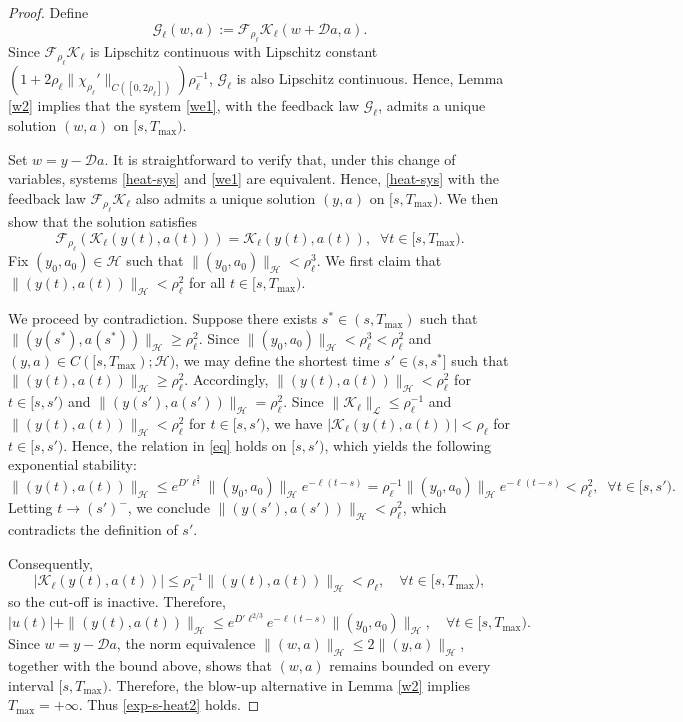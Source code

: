 \documentclass[10pt,a4paper]{amsart}
\begin{document}
\begin{proof}
Define
\begin{equation}\label{Gfeed-new}
\mathcal G_\ell(w,a):=\mathcal F_{\rho_\ell}\mathcal K_\ell(w+\mathcal Da,a).
\end{equation}
Since $\mathcal{F}_{\rho_{\ell}}\mathcal{K}_{\ell}$ is Lipschitz continuous with Lipschitz constant $(1+2{\rho_{\ell}}\|\chi_{\rho_{\ell}}'\|_{C([0,2\rho_{\ell}])})\rho_{\ell}^{-1}$, $\mathcal G_\ell$ is also Lipschitz continuous. Hence, Lemma \ref{w2} implies that the system \eqref{we1}, with the feedback law $\mathcal G_\ell$, admits a unique solution $(w,a)$ on $[s,T_{\max})$.

Set $w=y-\mathcal D a$. It is straightforward to verify that, under this change of variables, systems \eqref{heat-sys} and \eqref{we1} are equivalent. Hence, \eqref{heat-sys} with the feedback law $\mathcal{F}_{\rho_{\ell}}\mathcal{K}_{\ell}$ also admits a unique solution $(y,a)$ on $[s,T_{\max})$. We then show that the solution satisfies
\begin{equation}\label{eq}
\mathcal{F}_{\rho_{\ell}}(\mathcal{K}_{\ell}(y(t),a(t)))=\mathcal{K}_{\ell}(y(t),a(t)),\;\;\forall  t\in [s,T_{\max}).
\end{equation}
Fix $(y_0,a_0)\in \mathcal{H}$ such that
$\| (y_0,a_0)\|_{\mathcal{H}}<\rho_{\ell}^3$. We first claim that $\| (y(t),a(t))\|_{\mathcal{H}}< \rho_{\ell}^2$ for all $t\in [s,T_{\max})$.
	
We proceed by contradiction. Suppose there exists $s^*\in (s,T_{\max})$ such that $\|(y(s^*),a(s^*))\|_{\mathcal{H}}\ge \rho_{\ell}^2$.
Since $\| (y_0,a_0)\|_{\mathcal{H}}<\rho_{\ell}^3<\rho_{\ell}^2$ and $(y,a)\in C([s,T_{\max});\mathcal{H})$, we may define the shortest time $s'\in(s,s^*]$ such that $\| (y(t),a(t))\|_{\mathcal{H}}\ge \rho_{\ell}^2$. Accordingly,
$\| (y(t),a(t))\|_{\mathcal{H}}<  \rho_{\ell}^2$ for $t\in [s,s')$ and $\| (y(s'),a(s'))\|_{\mathcal{H}}=\rho_{\ell}^2$. Since $\|\mathcal K_\ell\|_{\mathcal L}\le\rho_\ell^{-1}$ and $\|(y(t),a(t))\|_{\mathcal H}<\rho_\ell^2$ for $t\in[s,s')$, we have $|\mathcal K_\ell(y(t),a(t))|<\rho_\ell$ for $t\in [s,s')$. Hence, the relation in \eqref{eq} holds on $[s,s')$, which yields the following exponential stability:
$$\| (y(t),a(t))\|_{\mathcal{H}}\le e^{D'{\ell}^{\frac{2}{3}}}\| (y_0,a_0)\|_{\mathcal{H}}e^{-\ell(t-s)}=\rho_{\ell}^{-1}\| (y_0,a_0)\|_{\mathcal{H}}e^{-\ell(t-s)}<\rho_{\ell}^2, \;\; \forall t\in [s,s').$$
Letting $t\to (s')^-$, we conclude $\| (y(s'),a(s'))\|_{\mathcal{H}}<\rho_{\ell}^2$, which contradicts the definition of $s'$. 

Consequently,
$$|\mathcal K_\ell(y(t),a(t))|
\le \rho_\ell^{-1}\|(y(t),a(t))\|_{\mathcal H}
<\rho_\ell,\quad \forall t\in[s,T_{\max}),$$
so the cut-off is inactive. Therefore,
$$|u(t)|+\|(y(t),a(t))\|_{\mathcal H}
\le e^{D'\ell^{2/3}}e^{-\ell(t-s)}
\|(y_0,a_0)\|_{\mathcal H},\quad \forall t\in[s,T_{\max}).$$
Since $w=y-\mathcal Da$, the norm equivalence $\|(w,a)\|_{\mathcal H}\le 2\|(y,a)\|_{\mathcal H}$, together with the bound above, shows that $(w,a)$ remains bounded on every interval $[s,T_{\max})$. Therefore, the blow-up alternative in Lemma \ref{w2} implies $T_{\max}=+\infty$. Thus \eqref{exp-s-heat2} holds.
\end{proof}
\end{document}
